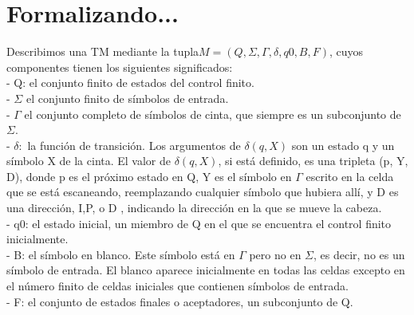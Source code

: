 \documentclass[12pt,a4paper]{article}
\begin{document}
\section{Formalizando...}
Describimos una TM mediante la tupla$ M = (Q, \Sigma, \Gamma, \delta, q0, B, F)$, cuyos componentes tienen los siguientes significados:\\
- Q: el conjunto finito de estados del control finito.\\
- $\Sigma$ el conjunto finito de símbolos de entrada.\\
- $\Gamma$ el conjunto completo de símbolos de cinta, que siempre es un subconjunto de $\Sigma$.\\
- $\delta:$ la función de transición. Los argumentos de $\delta(q, X)$ son un estado q y un símbolo X de la cinta. El valor de $\delta(q, X)$, si está definido, es una tripleta (p, Y, D), donde p es el próximo estado en Q, Y es el símbolo en $\Gamma$ escrito en la celda que se está escaneando, reemplazando cualquier símbolo que hubiera allí, y D es una dirección, I,P, o D , indicando la dirección en la que se mueve la cabeza.\\
- q0: el estado inicial, un miembro de Q en el que se encuentra el control finito inicialmente.\\
- B: el símbolo en blanco. Este símbolo está en $\Gamma$ pero no en $\Sigma$, es decir, no es un símbolo de entrada. El blanco aparece inicialmente en todas las celdas excepto en el número finito de celdas iniciales que contienen símbolos de entrada.\\
- F: el conjunto de estados finales o aceptadores, un subconjunto de Q.\\
\end{document}
